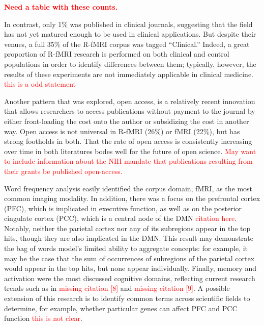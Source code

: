 \documentclass[5p]{elsarticle}
\begin{document}
\textcolor{red}{\bf Need a table with these counts.}

In contrast, only 1\% was published in clinical journals, suggesting that the
field has not yet matured enough to be used in clinical applications. But
despite their venues, a full 35\% of the R-fMRI corpus was tagged “Clinical.”
Indeed, a great proportion of R-fMRI research is performed on both clinical and
control populations in order to identify differences between them; typically,
however, the results of these experiments are not immediately applicable in
clinical medicine. \textcolor{red}{this is a odd statement}

Another pattern that was explored, open access, is a relatively recent
innovation that allows researchers to access publications without payment to the
journal by either front-loading the cost onto the author or subsidizing the cost
in another way. Open access is not universal in R-fMRI (26\%) or fMRI (22\%), but
has strong footholds in both. That the rate of open access is consistently
increasing over time in both literatures bodes well for the future of open
science. \textcolor{red}{May want to include information about the NIH mandate
that publications resulting from their grants be published open-access.}

Word frequency analysis easily identified the corpus domain, fMRI, as the most
common imaging modality. In addition, there was a focus on the prefrontal cortex
(PFC), which is implicated in executive function, as well as on the posterior
cingulate cortex (PCC), which is a central node of the DMN
\textcolor{red}{citation here}.
Notably, neither the parietal cortex nor any of its subregions appear in the top
hits, though they are also implicated in the DMN. This result may demonstrate the bag
of words model’s limited ability to aggregate concepts: for example, it may be
the case that the sum of occurrences of subregions of the parietal cortex would
appear in the top hits, but none appear individually. Finally, memory and
activation were the most discussed cognitive domains, reflecting current
research trends such as in \textcolor{red}{missing citation [8]} and
\textcolor{red}{missing citation [9]}. A possible extension of this research is
to identify common terms across scientific fields to determine, for example,
whether particular genes can affect PFC and PCC function \textcolor{red}{this is
not clear}.
\end{document}
